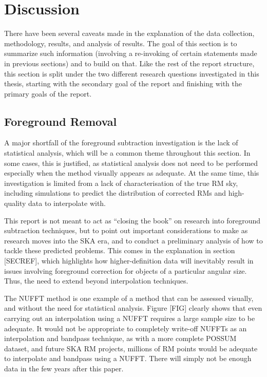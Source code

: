 \chapter{Discussion}
\label{cha:discussion}

There have been several caveats made in the explanation of the data collection, methodology, results, and analysis of results. The goal of this section is to summarize such information (involving a re-invoking of certain statements made in previous sections) and to build on that. Like the rest of the report structure, this section is split under the two different research questions investigated in this thesis, starting with the secondary goal of the report and finishing with the primary goals of the report.

\section{Foreground Removal}
\label{sec:fr_disc}

A major shortfall of the foreground subtraction investigation is the lack of statistical analysis, which will be a common theme throughout this section. In some cases, this is justified, as statistical analysis does not need to be performed especially when the method visually appears as adequate. At the same time, this investigation is limited from a lack of characterisation of the true RM sky, including simulations to predict the distribution of corrected RMs and high-quality data to interpolate with.


This report is not meant to act as “closing the book” on research into foreground subtraction techniques, but to point out important considerations to make as research moves into the SKA era, and to conduct a preliminary analysis of how to tackle these predicted problems. This comes in the explanation in section [SECREF], which highlights how higher-definition data will inevitably result in issues involving foreground correction for objects of a particular angular size. Thus, the need to extend beyond interpolation techniques.


The NUFFT method is one example of a method that can be assessed visually, and without the need for statistical analysis. Figure [FIG] clearly shows that even carrying out an interpolation using a NUFFT requires a large sample size to be adequate. It would not be appropriate to completely write-off NUFFTs as an interpolation and bandpass technique, as with a more complete POSSUM dataset, and future SKA RM projects, millions of RM points would be adequate to interpolate and bandpass using a NUFFT. There will simply not be enough data in the few years after this paper.



